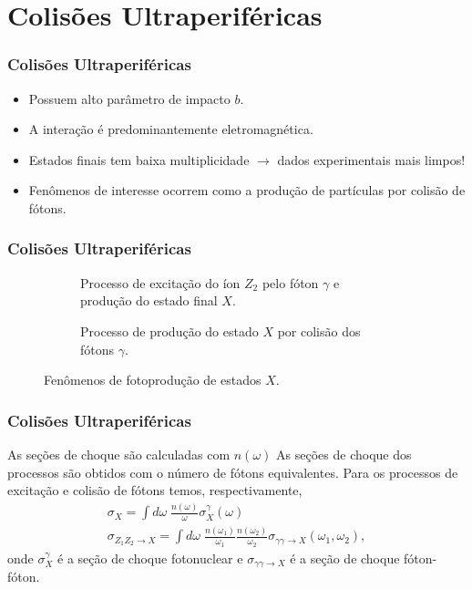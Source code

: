\documentclass[xcolor=dvipsnames]{beamer}
\begin{document}
\section{Colisões Ultraperiféricas}
\begin{frame}
	\frametitle{Colisões Ultraperiféricas}
	\begin{itemize}
		\item Possuem alto parâmetro de impacto $b$.
		\item A interação é predominantemente eletromagnética.
		\item Estados finais tem baixa multiplicidade $\rightarrow$ dados
			experimentais mais limpos!
		\item Fenômenos de interesse ocorrem como a produção de partículas por
			colisão de fótons.
	\end{itemize}
\end{frame}

\begin{frame}
	\frametitle{Colisões Ultraperiféricas}
	\begin{figure}
		\begin{subfigure}[b]{0.45\textwidth}
			\centering
			
			\caption{Processo de excitação do íon $Z_2$ pelo fóton $\gamma$ e
			produção do estado final $X$.}
		\end{subfigure}
		\hspace{0.25cm}
		\begin{subfigure}[b]{0.45\textwidth}
			\centering
			
			\caption{Processo de produção do estado $X$ por colisão dos fótons
			$\gamma$.}
		\end{subfigure}
		\caption{Fenômenos de fotoprodução de estados $X$.}
	\end{figure}
\end{frame}

\begin{frame}
	\frametitle{Colisões Ultraperiféricas}
	\begin{block}{As seções de choque são calculadas com $n(\omega)$}
		As seções de choque dos processos são obtidos com o número de fótons
		equivalentes. Para os processos de excitação e colisão de fótons temos,
		respectivamente,
		\begin{gather}
			\sigma _X = \int d\omega \; \frac{n(\omega)}{\omega} \sigma _X
			^\gamma (\omega) \\
			\sigma _{Z_1 Z_2 \rightarrow X} = \int d\omega \;
			\frac{n(\omega _1)}{\omega _1} \frac{n(\omega _2)}{\omega _2}
			\sigma_{\gamma \gamma \rightarrow X}(\omega _1, \omega _2),
		\end{gather}
		onde $\sigma _X ^\gamma$ é a seção de choque fotonuclear e $\sigma
		_{\gamma \gamma \rightarrow X}$ é a seção de choque fóton-fóton.
	\end{block}
\end{frame}
\end{document}
